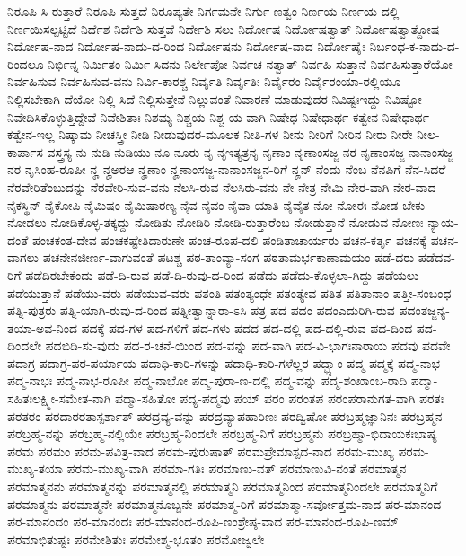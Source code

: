 {ನಿರೂಪಿ-ಸಿ-ರುತ್ತಾರೆ
ನಿರೂಪಿ-ಸುತ್ತದೆ
ನಿರೂಪ್ಯತೇ
ನಿರ್ಗಮನೇ
ನಿರ್ಗು-ಣತ್ವಂ
ನಿರ್ಣಯ
ನಿರ್ಣಯ-ದಲ್ಲಿ
ನಿರ್ಣಯಿಸಲ್ಪಟ್ಟಿದೆ
ನಿರ್ದೆಶ
ನಿರ್ದೆಶಿ-ಸುತ್ತವೆ
ನಿರ್ದೇಶಿ-ಸಲು
ನಿರ್ದೋಷ
ನಿರ್ದೋಷತ್ವಾತ್
ನಿರ್ದೋಷತ್ವಾತ್ದೋಷ
ನಿರ್ದೋಷ-ನಾದ
ನಿರ್ದೋಷ-ನಾದು-ದ-ರಿಂದ
ನಿರ್ದೋಷನು
ನಿರ್ದೋಷ-ವಾದ
ನಿರ್ದೋಷೈಃ
ನಿರ್ಬಂಧ-ಕ-ನಾದು-ದ-ರಿಂದಲೂ
ನಿರ್ಭಿನ್ನ
ನಿರ್ಮಿತಂ
ನಿರ್ಮಿ-ಸಿದನು
ನಿರ್ಲೇಪೋ
ನಿರ್ವಚ-ನತ್ವಾತ್
ನಿರ್ವಹಿ-ಸುತ್ತಾನೆ
ನಿರ್ವಹಿಸುತ್ತಾರೆಯೋ
ನಿರ್ವಹಿಸುವ
ನಿರ್ವಹಿಸುವ-ವನು
ನಿರ್ವಿ-ಕಾರಶ್ಚ
ನಿರ್ವೃತಿ
ನಿರ್ವೃತಿಃ
ನಿರ್ವೈರಂ
ನಿರ್ವೈರಂಯಾ-ರಲ್ಲಿಯೂ
ನಿಲ್ಲಿಸಬೇಕಾಗಿ-ದೆಯೋ
ನಿಲ್ಲಿ-ಸಿದೆ
ನಿಲ್ಲಿಸುತ್ತೇನೆ
ನಿಲ್ಲುವಂತೆ
ನಿವಾರಣೆ-ಮಾಡುವುದರ
ನಿವಿಷ್ಟಃಇದ್ದು
ನಿವಿಷ್ಟೋ
ನಿವೇದಿಸಿಕೊಳ್ಳುತ್ತಿದ್ದೇವೆ
ನಿವೇಶಿತಾಃ
ನಿಶಮ್ಯ
ನಿಶ್ಚಯ
ನಿಶ್ಚ-ಯ-ವಾಗಿ
ನಿಷೇಧ
ನಿಷೇಧಾರ್ಥ-ಕತ್ವೇನ
ನಿಷೇಧಾರ್ಥ-ಕತ್ವೇನ-ಇಲ್ಲ
ನಿಷ್ಕಾಮ
ನೀಚಸ್ತ್ರೀ
ನೀಡಿ
ನೀಡುವುದರ-ಮೂಲಕ
ನೀತಿ-ಗಳ
ನೀನು
ನೀರಿಗೆ
ನೀರಿನ
ನೀರು
ನೀರೇ
ನೀಲ-ಕಾರ್ಪಾಸ-ವಸ್ತ್ರಸ್ಯ
ನು
ನುಡಿ
ನುಡಿಯು
ನೂ
ನೂರು
ನೃ
ನೃಇತ್ಯತ್ರನೃ
ನೃಣಾಂ
ನೃಣಾಂಸಜ್ಜ-ನರ
ನೃಣಾಂಸಜ್ಜ-ನಾನಾಂಸಜ್ಜ-ನರ
ನೃಸಿಂಹ-ರೂಪೀ
ನೄ
ನೄಅರಆ
ನೄಣಾಂ
ನೄಣಾಂಸಜ್ಜ-ನಾನಾಂಸಜ್ಜನ-ರಿಗೆ
ನೄನ್
ನೆಂದು
ನೆಂಬ
ನೆನಪಿಗೆ
ನೆನ-ಸಿದರೆ
ನೆರವೇರಿತೆಂಬುದನ್ನು
ನೆರವೇರಿ-ಸುವ-ವನು
ನೆಲಸಿ-ರುವ
ನೆಲಸಿರು-ವನು
ನೇ
ನೇತ್ರ
ನೇಮಿ
ನೇರ-ವಾಗಿ
ನೇರ-ವಾದ
ನೈಕಸ್ಥಿನ್
ನೈಕೋಪಿ
ನೈಮಿಷಂ
ನೈಮಿಷಾರಣ್ಯ
ನೈವ
ನೈವಂ
ನೈವಾ-ಯಾತಿ
ನೈವೈತ
ನೋ
ನೋಈ
ನೋಡ-ಬೇಕು
ನೋಡಲು
ನೋಡಿಕೊಳ್ಳ-ತಕ್ಕದ್ದು
ನೋಡಿತು
ನೋಡಿರಿ
ನೋಡಿ-ರುತ್ತಾರೆಂಬ
ನೋಡುತ್ತಾನೆ
ನೋಡುವ
ನೋಣಃ
ನ್ಯಾಯ-ದಂತೆ
ಪಂಚಕಂತ-ದೇವ
ಪಂಚಕಷ್ಟೇತಿದಾರುಣೇ
ಪಂಚ-ರೂಪ-ದಲಿ
ಪಂಡಿತಾಚಾರ್ಯರು
ಪಚನ-ಕರ್ತೃ
ಪಚನಕ್ಕೆ
ಪಚನ-ವಾಗಲು
ಪಚನೇನಜೀರ್ಣ-ವಾಗುವಂತೆ
ಪಟಶ್ಚ
ಪಠ-ತಾಂವ್ಯಾ-ಸಂಗ
ಪಠತಾಮರ್ಭಕಾಣಾಮಯಂ
ಪಡೆ-ದರು
ಪಡೆದವ-ರಿಗೆ
ಪಡೆದಿರಬೇಕೆಂದು
ಪಡೆ-ದಿ-ರುವ
ಪಡೆ-ದಿ-ರುವು-ದ-ರಿಂದ
ಪಡೆದು
ಪಡೆದು-ಕೊಳ್ಳಲಾ-ಗಿದ್ದು
ಪಡೆಯಲು
ಪಡೆಯುತ್ತಾನೆ
ಪಡೆಯು-ವರು
ಪಡೆಯುವ-ವರು
ಪತಂತಿ
ಪತಂತ್ಯಂಧೇ
ಪತಂತ್ಯೇವ
ಪತಿತ
ಪತಿತಾನಾಂ
ಪತ್ತೀ-ಸಂಬಂಧ
ಪತ್ನಿ-ಪುತ್ರರು
ಪತ್ನಿ-ಯಾಗಿ-ರುವು-ದ-ರಿಂದ
ಪತ್ನೀತ್ವಾನ್ನಾರಾ-ಽಸಿ
ಪತ್ರ
ಪದ
ಪದಂ
ಪದಂಎದುರಿಗಿ-ರುವ
ಪದಂತಜ್ಜನ್ಯ-ತಯಾ-ಅವ-ನಿಂದ
ಪದಕ್ಕೆ
ಪದ-ಗಳ
ಪದ-ಗಳಿಗೆ
ಪದ-ಗಳು
ಪದದ
ಪದ-ದಲ್ಲಿ
ಪದ-ದಲ್ಲಿ-ರುವ
ಪದ-ದಿಂದ
ಪದ-ದಿಂದಲೇ
ಪದಬಿಡಿ-ಸು-ವುದು
ಪದ-ರ-ಚನೆ-ಯಿಂದ
ಪದ-ವನ್ನು
ಪದ-ವಾಗಿ
ಪದ-ವಿ-ಭಾಗಃನಾರಾಯ
ಪದವು
ಪದವೇ
ಪದಾಗ್ರ
ಪದಾಗ್ರ-ಪರ-ಪರ್ಯಾಯ
ಪದಾಧಿ-ಕಾರಿ-ಗಳನ್ನು
ಪದಾಧಿ-ಕಾರಿ-ಗಳೆಲ್ಲರ
ಪದ್ಭ್ಯಾಂ
ಪದ್ಮ
ಪದ್ಮಕ್ಕೆ
ಪದ್ಮ-ನಾಭ
ಪದ್ಮ-ನಾಭಃ
ಪದ್ಮ-ನಾಭ-ರೂಪೀ
ಪದ್ಮ-ನಾಭೋ
ಪದ್ಮ-ಪುರಾ-ಣ-ದಲ್ಲಿ
ಪದ್ಮ-ವನ್ನು
ಪದ್ಮ-ಶಂಖಾಂಬ-ರಾದಿ
ಪದ್ಮಾ-ಸಹಿತಃಲಕ್ಷ್ಮೀ-ಸಮೇತ-ನಾಗಿ
ಪದ್ಮಾ-ಸಹಿತೋ
ಪದ್ಯ-ಪದ್ಮವು
ಪಯ್
ಪರಂ
ಪರಂತಪ
ಪರಂಪರಾನುಗತ-ವಾಗಿ
ಪರತಃ
ಪರತರಂ
ಪರದಾರರತಾಸ್ಪರ್ಶಾತ್
ಪರದ್ರವ್ಯ-ವನ್ನು
ಪರದ್ರವ್ಯಾಪಹಾರಿಣಃ
ಪರದ್ವಿಷೋ
ಪರಬ್ರಹ್ಮಜ್ಞಾನಿನಃ
ಪರಬ್ರಹ್ಮನ
ಪರಬ್ರಹ್ಮ-ನನ್ನು
ಪರಬ್ರಹ್ಮ-ನಲ್ಲಿಯೇ
ಪರಬ್ರಹ್ಮ-ನಿಂದಲೇ
ಪರಬ್ರಹ್ಮ-ನಿಗೆ
ಪರಬ್ರಹ್ಮನು
ಪರಬ್ರಹ್ಮಾ-ಭಿದಾಯಕಃಭಾಷ್ಯ
ಪರಮ
ಪರಮಂ
ಪರಮ-ಪವಿತ್ರ-ವಾದ
ಪರಮ-ಪುರುಷಾತ್
ಪರಮಪ್ರೇಮಾಸ್ಪದ-ನಾದ
ಪರಮ-ಮುಖ್ಯ
ಪರಮ-ಮುಖ್ಯ-ತಯಾ
ಪರಮ-ಮುಖ್ಯ-ವಾಗಿ
ಪರಮಾ-ಗತಿಃ
ಪರಮಾಣು-ವತ್
ಪರಮಾಣುವಿ-ನಂತೆ
ಪರಮಾತ್ಮನ
ಪರಮಾತ್ಮನನು
ಪರಮಾತ್ಮನನ್ನು
ಪರಮಾತ್ಮನಲ್ಲಿ
ಪರಮಾತ್ಮನಿ
ಪರಮಾತ್ಮನಿಂದ
ಪರಮಾತ್ಮನಿಂದಲೇ
ಪರಮಾತ್ಮನಿಗೆ
ಪರಮಾತ್ಮನು
ಪರಮಾತ್ಮನೇ
ಪರಮಾತ್ಮನೊಬ್ಬನೇ
ಪರಮಾತ್ಮ-ರಿಗೆ
ಪರಮಾತ್ಮಾ-ಸರ್ವೋತ್ತಮ-ನಾದ
ಪರ-ಮಾನಂದ
ಪರ-ಮಾನಂದಂ
ಪರ-ಮಾನಂದಃ
ಪರ-ಮಾನಂದ-ರೂಪಿ-ಣಂಶ್ರೇಷ್ಠ-ವಾದ
ಪರ-ಮಾನಂದ-ರೂಪಿ-ಣಮ್
ಪರಮಾಭಿತುಷ್ಟಃ
ಪರಮೇಶಿತುಃ
ಪರಮೇಶ್ಮ-ಭೂತಂ
ಪರಮೋಜ್ವಲೇ
}
